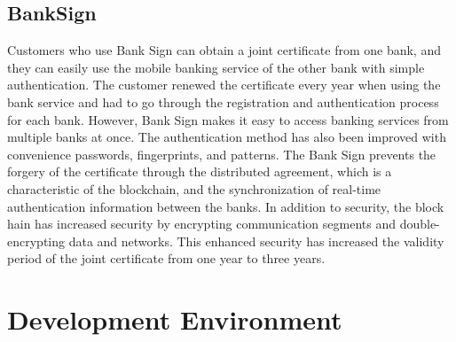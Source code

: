\documentclass[conference]{IEEEtran}
\begin{document}
\subsection{BankSign}
Customers who use Bank Sign can obtain a joint certificate from one bank, and they can easily use the mobile banking service of the other bank with simple authentication. The customer renewed the certificate every year when using the bank service and had to go through the registration and authentication process for each bank. However, Bank Sign makes it easy to access banking services from multiple banks at once. The authentication method has also been improved with convenience passwords, fingerprints, and patterns. The Bank Sign prevents the forgery of the certificate through the distributed agreement, which is a characteristic of the blockchain, and the synchronization of real-time authentication information between the banks. In addition to security, the block hain has increased security by encrypting communication segments and double-encrypting data and networks. This enhanced security has increased the validity period of the joint certificate from one year to three years.

\section{Development Environment}
\end{document}
